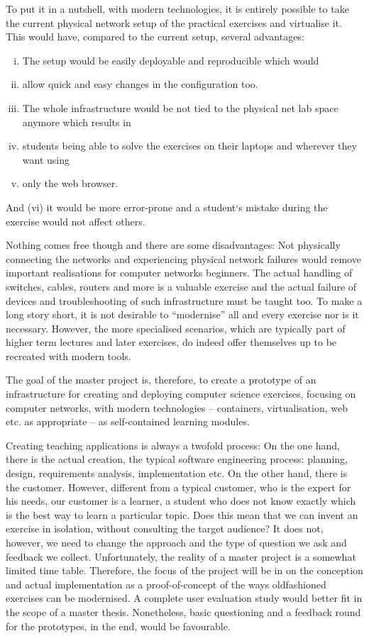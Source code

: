 To put it in a nutshell, with modern technologies, it is entirely possible to take the current physical network setup of the practical exercises and virtualise it.
This would have, compared to the current setup, several advantages:

\begin{enumerate}[(i)]
    \item The setup would be easily deployable and reproducible which would
    \item allow quick and easy changes in the configuration too.
    \item The whole infrastructure would be not tied to the physical net lab space anymore which results in
    \item students being able to solve the exercises on their laptops and wherever they want using
    \item only the web browser.
\end{enumerate}
And (vi) it would be more error-prone and a student‘s mistake
during the exercise would not affect others.

Nothing comes free though and there are some disadvantages:
Not physically connecting the networks and experiencing physical network failures would remove important realisations for computer networks beginners.
The actual handling of switches, cables, routers and more is a valuable exercise and the actual failure of devices and troubleshooting of such infrastructure must be taught too.
To make a long story short, it is not desirable to \enquote{modernise}
all and every exercise nor is it necessary.
However, the more specialised scenarios, which are typically part of higher term lectures and later exercises, do indeed offer themselves up to be recreated with modern tools.

The goal of the master project is, therefore, to create a prototype of an infrastructure for creating and deploying computer science exercises, focusing on computer networks, with modern technologies -- containers, virtualisation, web etc. as appropriate  -- as self-contained learning modules.

Creating teaching applications is always a twofold process:
On the one hand, there is the actual creation, the typical software engineering process:
planning, design, requirements analysis, implementation etc.
On the other hand, there is the customer.
However, different from a typical customer, who is the expert for his needs, our customer is a learner, a student who does not know exactly which is the best way to learn a particular topic.
Does this mean that we can invent an exercise in isolation, without consulting the target audience?
It does not, however, we need to change the approach and the type of question we ask and feedback we collect.
Unfortunately, the reality of a master project is a somewhat limited time table.
Therefore, the focus of the project will be in on the conception and actual implementation as a proof-of-concept of the ways oldfashioned exercises can be modernised. 
A complete user evaluation study would better fit in the scope of a master thesis.
Nonetheless, basic questioning and a feedback round for the prototypes, in the end, would be favourable.

